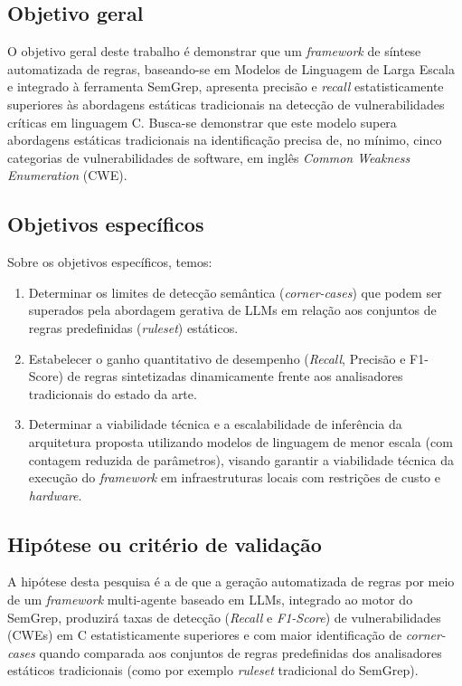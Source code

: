 \documentclass[
    12pt,                %
    openright,           %
    oneside,             %
    a4paper,             %
    english,             %
    brazil               %
]{abntex2}
\begin{document}
\subsection{Objetivo geral}
\label{sec:objgeral}
\par
O objetivo geral deste trabalho é demonstrar que um \textit{framework} de síntese automatizada de regras, baseando-se em Modelos de Linguagem de Larga Escala e integrado à ferramenta SemGrep, apresenta precisão e \textit{recall} estatisticamente superiores às abordagens estáticas tradicionais na detecção de vulnerabilidades críticas em linguagem C.
Busca-se demonstrar que este modelo supera abordagens estáticas tradicionais na identificação precisa de, no mínimo, cinco categorias de vulnerabilidades de software, em inglês \textit{Common Weakness Enumeration} (CWE).

\subsection{Objetivos específicos}
\label{sec:objespecifico}
\par
Sobre os objetivos específicos, temos:

\begin{enumerate}
  \item Determinar os limites de detecção semântica (\textit{corner-cases}) que podem ser superados pela abordagem gerativa de LLMs em relação aos conjuntos de regras predefinidas (\textit{ruleset}) estáticos.
  \item Estabelecer o ganho quantitativo de desempenho (\textit{Recall}, Precisão e F1-Score) de regras sintetizadas dinamicamente frente aos analisadores tradicionais do estado da arte.
  \item Determinar a viabilidade técnica e a escalabilidade de inferência da arquitetura proposta utilizando modelos de linguagem de menor escala (com contagem reduzida de parâmetros), visando garantir a viabilidade técnica da execução do \textit{framework} em infraestruturas locais com restrições de custo e \textit{hardware}.
\end{enumerate}

\subsection{Hipótese ou critério de validação}
\label{sec:hipotese}
\par
A hipótese desta pesquisa é a de que a geração automatizada de regras por meio de um \textit{framework} multi-agente baseado em LLMs, integrado ao motor do SemGrep, produzirá taxas de detecção (\textit{Recall} e \textit{F1-Score}) de vulnerabilidades (CWEs) em C estatisticamente superiores e com maior identificação de \textit{corner-cases} quando comparada aos conjuntos de regras predefinidas dos analisadores estáticos tradicionais (como por exemplo \textit{ruleset} tradicional do SemGrep).
\end{document}
